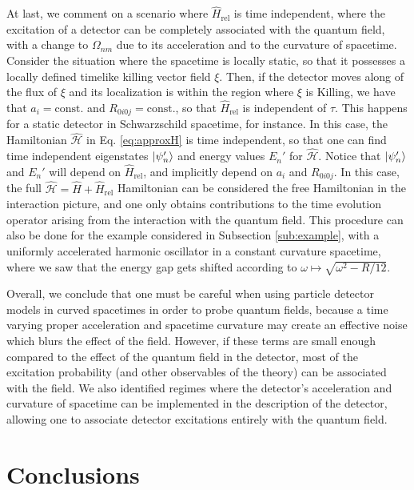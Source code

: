 \documentclass[prd,twocolumn,superscriptaddress,floatfix,amsmath,amssymb,amsfonts,longbibliography,nofootinbib]{revtex4-1}
\begin{document}
At last, we comment on a scenario where $\hat{H}_{\text{rel}}$ is time independent, where the excitation of a detector can be completely associated with the quantum field, with a change to $\Omega_{nm}$ due to its acceleration and to the curvature of spacetime. Consider the situation where the spacetime is locally static, so that it possesses a locally defined timelike killing vector field $\xi$. Then, if the detector moves along of the flux of $\xi$ and its localization is within the region where $\xi$ is Killing, we have that $a_i = \text{const.}$ and $R_{0i0j} = \text{const.}$, so that $\hat{H}_\text{rel}$ is independent of $\tau$. This happens for a static detector in Schwarzschild spacetime, for instance. In this case, the Hamiltonian $\hat{\mathcal{H}}$ in Eq. \eqref{eq:approxH} is time independent, so that one can find time independent eigenstates $\ket{\psi_n'}$ and energy values $E_n'$ for $\hat{\mathcal{H}}$. Notice that $\ket{\psi_n'}$ and $E_n'$ will depend on $\hat{H}_\text{rel}$, and implicitly depend on $a_i$ and $R_{0i0j}$. In this case, the full $\hat{\mathcal{H}} = \hat{H} + \hat{H}_{\text{rel}}$ Hamiltonian can be considered the free Hamiltonian in the interaction picture, and one only obtains contributions to the time evolution operator arising from the interaction with the quantum field. This procedure can also be done for the example considered in Subsection \ref{sub:example}, with a uniformly accelerated harmonic oscillator in a constant curvature spacetime, where we saw that the energy gap gets shifted according to $\omega \longmapsto \sqrt{\omega^2 - R/12}$.

Overall, we conclude that one must be careful when using particle detector models in curved spacetimes in order to probe quantum fields, because a time varying proper acceleration and spacetime curvature may create an effective noise which blurs the effect of the field. However, if these terms are small enough compared to the effect of the quantum field in the detector, most of the excitation probability (and other observables of the theory) can be associated with the field. We also identified regimes where the detector's acceleration and curvature of spacetime can be implemented in the description of the detector, allowing one to associate detector excitations entirely with the quantum field.



\section{Conclusions}\label{sec:conclusions}
\end{document}
